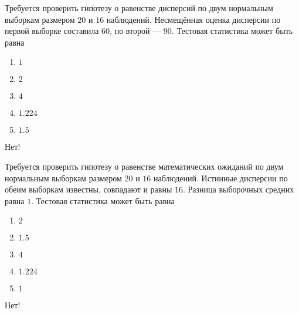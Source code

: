 \documentclass[t]{beamer}
\begin{document}
 \begin{frame} \label{3-No} 
\begin{block}{3} 

  Требуется проверить гипотезу о равенстве дисперсий по двум нормальным выборкам размером $20$ и $16$ наблюдений. Несмещённая оценка дисперсии по первой выборке составила $60$, по второй — $90$. Тестовая статистика может быть равна
  


 \end{block} 
\begin{enumerate} 
\item[] \hyperlink{3-No}{\beamergotobutton{} $1$}
\item[] \hyperlink{3-No}{\beamergotobutton{} $2$}
\item[] \hyperlink{3-No}{\beamergotobutton{} $4$}
\item[] \hyperlink{3-No}{\beamergotobutton{} $1.224$}
\item[] \hyperlink{3-Yes}{\beamergotobutton{} $1.5$}
\end{enumerate} 

 \alert{Нет!} 
\end{frame} 


 \begin{frame} \label{4-No} 
\begin{block}{4} 

  Требуется проверить гипотезу о равенстве математических ожиданий по двум нормальным выборкам размером $20$ и $16$ наблюдений. Истинные дисперсии по обеим выборкам известны, совпадают и равны $16$. Разница выборочных средних равна $1$. Тестовая статистика может быть равна
  


 \end{block} 
\begin{enumerate} 
\item[] \hyperlink{4-No}{\beamergotobutton{} $2$}
\item[] \hyperlink{4-No}{\beamergotobutton{} $1.5$}
\item[] \hyperlink{4-No}{\beamergotobutton{} $4$}
\item[] \hyperlink{4-No}{\beamergotobutton{} $1.224$}
\item[] \hyperlink{4-No}{\beamergotobutton{} $1$}
\end{enumerate} 

 \alert{Нет!} 
\end{frame} 
\end{document}
